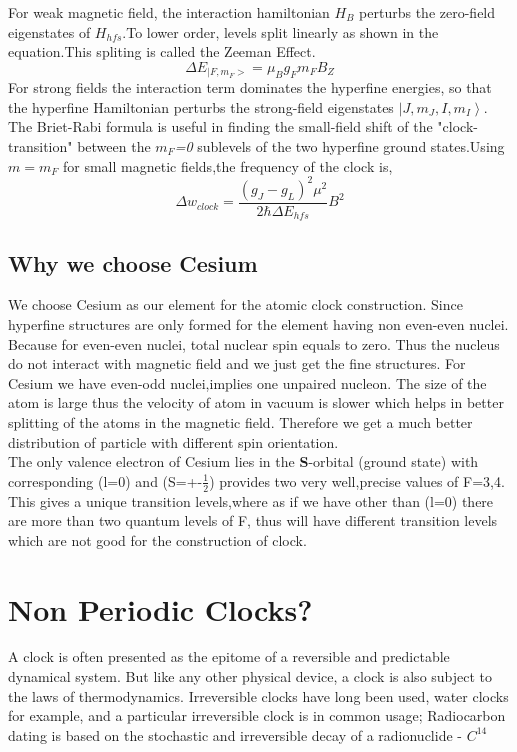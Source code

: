 \documentclass[%
 aapm,
 mph,%
 amsmath,amssymb,
 reprint,%
]{revtex4-2}
\begin{document}
 For weak magnetic field, the interaction hamiltonian\cite{steck2003cesium} $H_B$ perturbs the zero-field eigenstates of $H_{hfs}$.To lower order, levels split linearly as shown in the equation.This spliting is called the Zeeman Effect.
\begin{equation}
\Delta E_{|F,m_F>} = \mu_B g_Fm_FB_Z    
\end{equation}
For strong fields the interaction term dominates the hyperfine energies, so that the hyperfine Hamiltonian perturbs the strong-field eigenstates $\left|J,m_J, I,m_I\right\rangle$.\\
The Briet-Rabi formula is useful in finding the small-field shift of the "clock-transition" between the \emph{$m_F$=0} sublevels of the two hyperfine ground states.Using \emph{$m=m_F$} for small magnetic fields,the frequency of the clock is,
\begin{equation}
\Delta w_{clock} = \frac{(g_J-g_L)^2\mu^2}{2\hbar \Delta E_{hfs}}B^2
\end{equation}

\subsection{Why we choose Cesium}
We choose Cesium as our element for the atomic clock construction. Since hyperfine structures are only formed for the element having non even-even nuclei. Because for even-even nuclei, total nuclear spin equals to zero. Thus the nucleus do not interact with magnetic field and we just get the fine structures. For Cesium we have even-odd nuclei,implies one unpaired nucleon. The size of the atom is large thus the velocity of atom in vacuum is slower which helps in better splitting of the atoms in the magnetic field. Therefore we get a much better distribution of particle with different spin orientation.\\
The only valence electron of Cesium lies in the \textbf{S}-orbital (ground state) with corresponding (l=0) and (S=+-$\frac{1}{2}$) provides two very well,precise values of F=3,4. This gives a unique transition levels,where as if we have other than (l=0) there are more than two quantum levels of F, thus will have different transition levels which are not good for the construction of clock.

\section{Non Periodic Clocks?}
A clock is often presented as the epitome of a reversible and predictable dynamical system. But like any other physical device, a clock is also subject to the laws of thermodynamics. 
Irreversible clocks have long been used, water clocks for example, and a particular irreversible clock is in common usage; Radiocarbon dating is based on the stochastic and irreversible decay of a radionuclide - $C^{14}$
\end{document}
